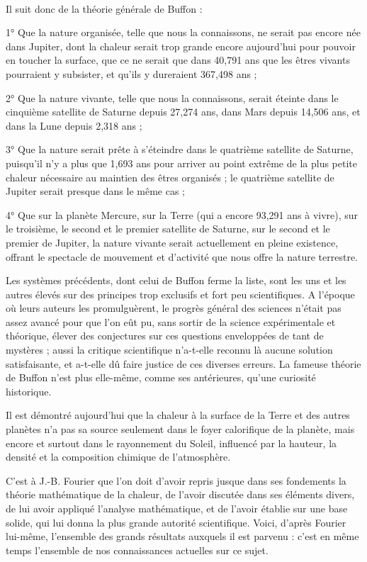 \documentclass[a4paper, 11pt, oneside, landscape]{article}
\begin{document}
\paragraph{}
Il suit donc de la théorie générale de Buffon :

1° Que la nature organisée, telle que nous la connaissons, ne serait pas encore née dans Jupiter, dont la chaleur serait trop grande encore aujourd'hui pour pouvoir en toucher la surface, que ce ne serait que dans 40,791 ans que les êtres vivants pourraient y subsister, et qu'ils y dureraient 367,498 ans ;

2° Que la nature vivante, telle que nous la connaissons, serait éteinte dans le cinquième satellite de Saturne depuis 27,274 ans, dans Mars depuis 14,506 ans, et dans la Lune depuis 2,318 ans ;

3° Que la nature serait prête à s'éteindre dans le quatrième satellite de Saturne, puisqu'il n'y a plus que 1,693 ans pour arriver au point extrême de la plus petite chaleur nécessaire au maintien des êtres organisés ; le quatrième satellite de Jupiter serait presque dans le même cas ;

4° Que sur la planète Mercure, sur la Terre (qui a encore 93,291 ans à vivre), sur le troisième, le second et le premier satellite de Saturne, sur le second et le premier de Jupiter, la nature vivante serait actuellement en pleine existence, offrant le spectacle de mouvement et d'activité que nous offre la nature terrestre.

Les systèmes précédents, dont celui de Buffon ferme la liste, sont les uns et les autres élevés sur des principes trop exclusifs et fort peu scientifiques. A l'époque où leurs auteurs les promulguèrent, le progrès général des sciences n'était pas assez avancé pour que l'on eût pu, sans sortir de la science expérimentale et théorique, élever des conjectures sur ces questions enveloppées de tant de mystères ; aussi la critique scientifique n'a-t-elle reconnu là aucune solution satisfaisante, et a-t-elle dû faire justice de ces diverses erreurs. La fameuse théorie de Buffon n'est plus elle-même, comme ses antérieures, qu'une curiosité historique.

Il est démontré aujourd'hui que la chaleur à la surface de la Terre et des autres planètes n'a pas sa source seulement dans le foyer calorifique de la planète, mais encore et surtout dans le rayonnement du Soleil, influencé par la hauteur, la densité et la composition chimique de l'atmosphère.

C'est à J.-B. Fourier que l'on doit d'avoir repris jusque dans ses fondements la théorie mathématique de la chaleur, de l'avoir discutée dans ses éléments divers, de lui avoir appliqué l'analyse mathématique, et de l'avoir établie sur une base solide, qui lui donna la plus grande autorité scientifique. Voici, d'après Fourier lui-même, l'ensemble des grands résultats auxquels il est parvenu : c'est en même temps l'ensemble de nos connaissances actuelles sur ce sujet.
\end{document}
